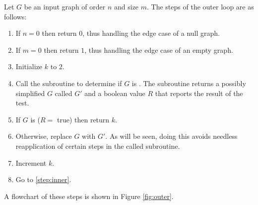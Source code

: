 Let \(G\) be an input graph of order \(n\) and size \(m\).  The steps of the outer loop are as follows:
\begin{enumerate}
\item \label{step:null} If \(n=0\) then return \(0\), thus handling the edge case of a null graph.

\item \label{step:one} If \(m=0\) then return \(1\), thus handling the edge case of an empty graph.

\item \label{step:init} Initialize \(k\) to \(2\).

\item \label{step:inner} Call the subroutine to determine if \(G\) is .  The subroutine returns a
  possibly simplified \(G\) called \(G'\) and a boolean value \(R\) that reports the result of the test.

\item \label{step:call} If \(G\) is  (\(R=\) true) then return \(k\).

\item \label{step:newg} Otherwise, replace \(G\) with \(G'\).  As will be seen, doing this avoids needless
  reapplication of certain steps in the called subroutine.

\item \label{step:incr} Increment \(k\).

\item \label{step:loop} Go to \ref{step:inner}.
\end{enumerate}
A flowchart of these steps is shown in Figure \ref{fig:outer}.

